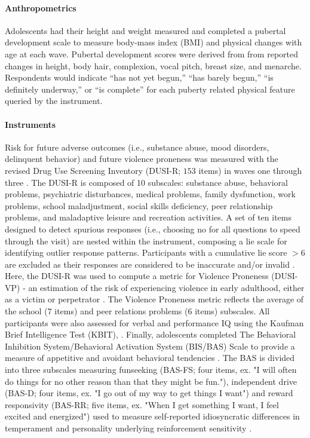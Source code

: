 \documentclass[utf8]{stylesheet}
\begin{document}
\paragraph{Anthropometrics} Adolescents had their height and weight measured and completed a pubertal development scale \citep{carskadon1993self} to measure body-mass index (BMI) and physical changes with age at each wave. Pubertal development scores were derived from from reported changes in height, body hair, complexion, vocal pitch, breast size, and menarche. Respondents would indicate “has not yet begun,” “has barely begun,” “is definitely underway,” or “is complete” for each puberty related physical feature queried by the instrument. 
\paragraph{Instruments} Risk for future adverse outcomes (i.e., substance abuse, mood disorders, delinquent behavior) and future violence proneness was measured with the revised Drug Use Screening Inventory (DUSI-R; $153$ items) in waves one through three \citep{tarter1994reliability}. The DUSI-R is composed of 10 subscales: substance abuse, behavioral problems, psychiatric disturbances, medical problems, family dysfunction, work problems, school maladjustment, social skills deficiency, peer relationship problems, and maladaptive leisure and recreation activities. A set of ten items designed to detect spurious responses (i.e., choosing no for all questions to speed through the visit) are nested within the instrument, composing a lie scale for identifying outlier response patterns. Participants with a cumulative lie score $>6$ are excluded as their responses are considered to be inaccurate and/or invalid \citep{dalla2003effects}. Here, the DUSI-R was used to compute a metric for Violence Proneness (DUSI-VP) - an estimation of the risk of experiencing violence in early adulthood, either as a victim or perpetrator \citep{kirisci2009violence}. The Violence Proneness metric reflects the average of the school ($7$ items) and peer relations problems ($6$ items) subscales. All participants were also assessed for verbal and performance IQ using the Kaufman Brief Intelligence Test (KBIT), \citep{kaufman2004kaufman}. Finally, adolescents completed The Behavioral Inhibition System/Behavioral Activation System (BIS/BAS) Scale  to provide a measure of appetitive and avoidant behavioral tendencies \citep{carver1994behavioral}. The BAS is divided into three subscales measuring funseeking (BAS-FS; four items, ex. "I will often do things for no other reason than that they might be fun."), independent drive (BAS-D; four items, ex. "I go out of my way to get things I want") and reward responsivity (BAS-RR; five items, ex. "When I get something I want, I feel excited and energized") used to measure self-reported idiosyncratic differences in temperament and personality underlying reinforcement sensitivity \citep{corr2004reinforcementsensitivity}.
\end{document}
